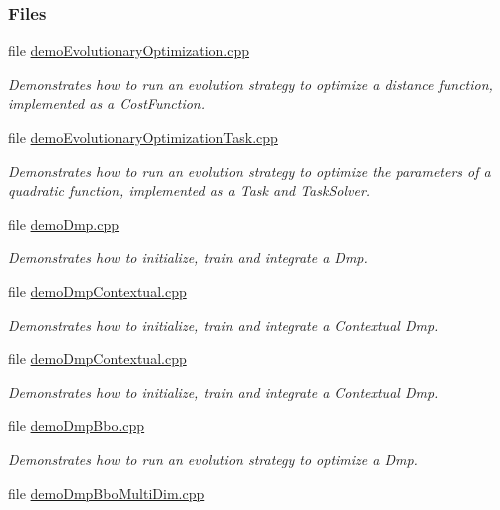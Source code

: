 \subsubsection*{Files}
\begin{DoxyCompactItemize}
\item 
file \hyperlink{demoEvolutionaryOptimization_8cpp}{demo\+Evolutionary\+Optimization.\+cpp}
\begin{DoxyCompactList}\small\item\em Demonstrates how to run an evolution strategy to optimize a distance function, implemented as a Cost\+Function. \end{DoxyCompactList}\item 
file \hyperlink{demoEvolutionaryOptimizationTask_8cpp}{demo\+Evolutionary\+Optimization\+Task.\+cpp}
\begin{DoxyCompactList}\small\item\em Demonstrates how to run an evolution strategy to optimize the parameters of a quadratic function, implemented as a Task and Task\+Solver. \end{DoxyCompactList}\item 
file \hyperlink{demoDmp_8cpp}{demo\+Dmp.\+cpp}
\begin{DoxyCompactList}\small\item\em Demonstrates how to initialize, train and integrate a Dmp. \end{DoxyCompactList}\item 
file \hyperlink{demoDmpContextual_8cpp}{demo\+Dmp\+Contextual.\+cpp}
\begin{DoxyCompactList}\small\item\em Demonstrates how to initialize, train and integrate a Contextual Dmp. \end{DoxyCompactList}\item 
file \hyperlink{demoDmpContextual_8cpp}{demo\+Dmp\+Contextual.\+cpp}
\begin{DoxyCompactList}\small\item\em Demonstrates how to initialize, train and integrate a Contextual Dmp. \end{DoxyCompactList}\item 
file \hyperlink{demoDmpBbo_8cpp}{demo\+Dmp\+Bbo.\+cpp}
\begin{DoxyCompactList}\small\item\em Demonstrates how to run an evolution strategy to optimize a Dmp. \end{DoxyCompactList}\item 
file \hyperlink{demoDmpBboMultiDim_8cpp}{demo\+Dmp\+Bbo\+Multi\+Dim.\+cpp}

\end{DoxyCompactItemize}
